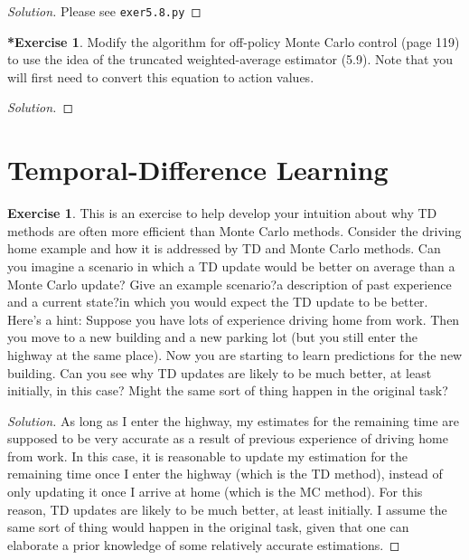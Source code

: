 \documentclass[oneside,11pt]{article}
\theoremstyle{definition}
\newtheorem{exer}[thm]{Exercise}
\newtheorem{exerstar}[thm]{*Exercise}
\newenvironment{solution}
{\renewcommand\qedsymbol{$\blacksquare$}\begin{proof}[Solution]} {\end{proof}}
\begin{document}
\begin{shaded}
\begin{solution} 
Please see \texttt{exer5.8.py}

\end{solution} 
\end{shaded}


\begin{exerstar}
Modify the algorithm for off-policy Monte Carlo control (page 119) to use the idea of the truncated weighted-average estimator (5.9). Note that you will first need to convert this equation to action values.
\end{exerstar}


\begin{shaded}
\begin{solution} 


\end{solution} 
\end{shaded}


\section{Temporal-Difference Learning}

\begin{exer}
This is an exercise to help develop your intuition about why TD methods are often more efficient than Monte Carlo methods. Consider the driving home example and how it is addressed by TD and Monte Carlo methods. Can you imagine a scenario in which a TD update would be better on average than a Monte Carlo update? Give an example scenario?a description of past experience and a current state?in which you would expect the TD update to be better. Here's a hint: Suppose you have lots of experience driving home from work. Then you move to a new building and a new parking lot (but you still enter the highway at the same place). Now you are starting to learn predictions for the new building. Can you see why TD updates are likely to be much better, at least initially, in this case? Might the same sort of thing happen in the original task?
\end{exer}

\begin{shaded}
\begin{solution} 
As long as I enter the highway, my estimates for the remaining time are supposed to be very accurate as a result of previous experience of driving home from work. In this case, it is reasonable to update my estimation for the remaining time once I enter the highway (which is the TD method), instead of only updating it once I arrive at home (which is the MC method). For this reason, TD updates are likely to be much better, at least initially. I assume the same sort of thing would happen in the original task, given that one can elaborate a prior knowledge of some relatively accurate estimations.

\end{solution} 
\end{shaded}
\end{document}
